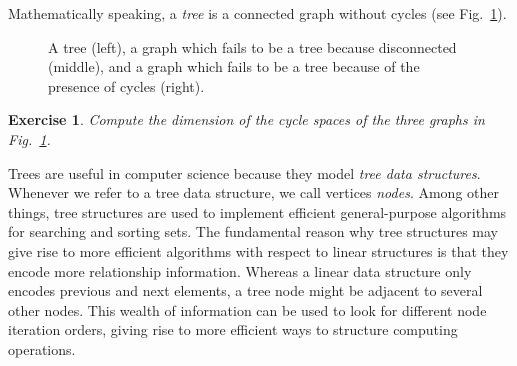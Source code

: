 \documentclass[a4paper]{book}
\theoremstyle{changebreak}                %
\newtheorem{ex}[result]{Exercise}
\begin{document}
Mathematically speaking, a {\it tree} is a connected
graph without cycles (see
Fig.~\ref{fig:tree}). 
\begin{figure}[!ht]
\begin{center}
\hfill
{}
\hfill
{}
\end{center}
\caption{A tree (left), a graph which fails to be a tree because
  disconnected (middle), and a graph which fails
  to be a tree because of the presence of cycles (right).}
\label{fig:tree}
\end{figure}

\begin{ex}
Compute the dimension of the cycle
spaces of the three graphs in Fig.~\ref{fig:tree}.
\end{ex}

Trees are useful in computer science because they model {\it tree data
  structures}.
Whenever we refer to a tree data structure, we call vertices {\it
  nodes}. Among other things, tree structures are
used to implement efficient general-purpose
algorithms for searching
and sorting sets. The fundamental reason why tree
structures may give rise to more efficient algorithms with respect to
linear structures is that they encode
more relationship information. Whereas a linear data structure only
encodes previous and next elements, a tree node might be adjacent to
several other nodes. This wealth of information can be used to look
for different node iteration orders, giving rise to more efficient
ways to structure computing operations.
\end{document}

